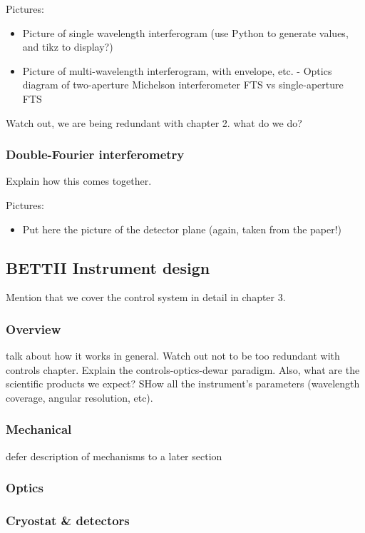 Pictures:
\begin{itemize}
\item Picture of single wavelength interferogram (use Python to generate values, and tikz to display?)
\item Picture of multi-wavelength interferogram, with envelope, etc.
- Optics diagram of two-aperture Michelson interferometer FTS vs single-aperture FTS
\end{itemize}

Watch out, we are being redundant with chapter 2. what do we do?

\subsubsection{Double-Fourier interferometry}

Explain how this comes together.

Pictures:
\begin{itemize}
\item Put here the picture of the detector plane (again, taken from the paper!)
\end{itemize}


\subsection{BETTII Instrument design}

Mention that we cover the control system in detail in chapter 3.

\subsubsection{Overview}
talk about how it works in general. Watch out not to be too redundant with controls chapter. Explain the controls-optics-dewar paradigm. Also, what are the scientific products we expect? SHow all the instrument's parameters (wavelength coverage, angular resolution, etc).

\subsubsection{Mechanical}
defer description of mechanisms to a later section
\subsubsection{Optics}

\subsubsection{Cryostat \& detectors}

